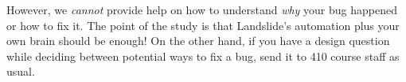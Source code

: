 \documentclass{article}
\begin{document}
\noindent
However, we {\em cannot} provide help on how to understand {\em why} your bug happened or how to fix it. The point of the study is that Landslide's automation plus your own brain should be enough! On the other hand, if you have a design question while deciding between potential ways to fix a bug, send it to 410 course staff as usual.


%
%
%
%
%
%
%
\end{document}
